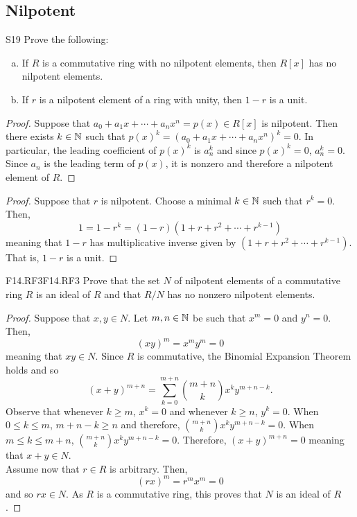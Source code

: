 \documentclass[../../AlgebraQualSolutions.tex]{subfiles}
\begin{document}
\subsection{Nilpotent}

\begin{prob}{S19}{}
	Prove the following:
	\begin{enumerate}[(a)]
	\item If $R$ is a commutative ring with no nilpotent elements, then $R[x]$ has no nilpotent elements.
	\item If $r$ is a nilpotent element of a ring with unity, then $1 - r$ is a unit.
	\end{enumerate}
	\end{prob}
	
	\begin{proof}
		Suppose that $a_0 + a_1 x + \cdots + a_nx^n = p(x) \in R[x]$ is nilpotent. Then there exists $k \in \mathbb{N}$ such that $p(x)^k = (a_0 + a_1 x + \cdots + a_nx^n)^k = 0$. In particular, the leading coefficient of $p(x)^k$ is $a_n^k$ and since $p(x)^k = 0$, $a_n^k = 0$. Since $a_n$ is the leading term of $p(x)$, it is nonzero and therefore a nilpotent element of $R$.
	\end{proof}
	
	\begin{proof}
		Suppose that $r$ is nilpotent. Choose a minimal $k \in \mathbb{N}$ such that $r^k = 0$. Then,
			\[1 = 1 - r^k = (1-r)(1 + r + r^2 + \cdots + r^{k-1})\]
		meaning that $1-r$ has multiplicative inverse given by $(1 + r + r^2 + \cdots + r^{k-1})$. That is, $1-r$ is a unit.
	\end{proof}

\begin{prob}{F14.RF3}{F14.RF3}
	Prove that the set $N$ of nilpotent elements of a commutative ring $R$ is an ideal of $R$ and that $R/N$ has no nonzero nilpotent elements.
\end{prob}

\begin{proof}
	Suppose that $x,y \in N$. Let $m,n \in \mathbb{N}$ be such that $x^m = 0$ and $y^n = 0$. Then,
		\[(xy)^m = x^my^m = 0 \]
	meaning that $xy \in N$. Since $R$ is commutative, the Binomial Expansion Theorem holds and so
		\[(x + y)^{m+n} = \sum_{k=0}^{m+n} {{m+n}\choose{k}}x^ky^{m+n - k}.\]
	Observe that whenever $k \geq m$, $x^k = 0$ and whenever $k \geq n$, $y^k = 0$. When $0 \leq k \leq m$, $m + n - k \geq n$ and therefore, ${{m+n}\choose{k}}x^ky^{m+n - k} = 0$. When $m \leq k \leq m+n$, ${{m+n}\choose{k}}x^ky^{m+n - k} = 0$. Therefore, $(x+y)^{m+n} = 0$ meaning that $x + y \in N$.\\

	Assume now that $r \in R$ is arbitrary. Then,
		\[(rx)^m = r^mx^m = 0\]
	and so $rx \in N$. As $R$ is a commutative ring, this proves that $N$ is an ideal of $R$.
\end{proof}
\end{document}
